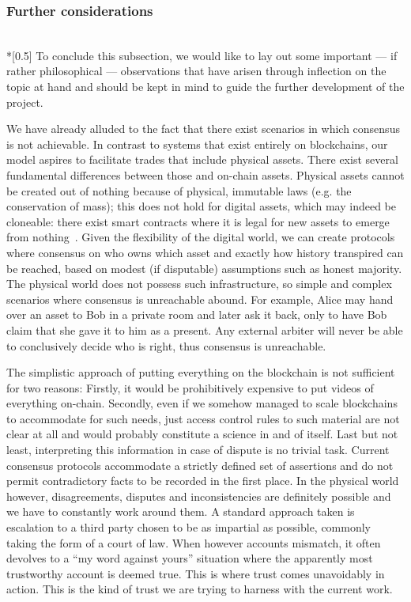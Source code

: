 \subsubsection{Further considerations} \ \\*[0.5\baselineskip]
  To conclude this subsection, we would like to lay out some important --- if rather
  philosophical --- observations that have arisen through inflection on the topic at hand
  and should be kept in mind to guide the further development of the project.

  We have already alluded to the fact that there exist scenarios in which consensus is not
  achievable. In contrast to systems that exist entirely on blockchains, our model aspires
  to facilitate trades that include physical assets. There exist several fundamental
  differences between those and on-chain assets. Physical assets cannot be created out of
  nothing because of physical, immutable laws (e.g. the conservation of mass); this
  does not hold for digital assets, which may indeed be cloneable: there exist smart
  contracts where it is legal for new assets to emerge from nothing~\cite{cryptokitties}.
  Given the flexibility of the digital world, we can create protocols where consensus on
  who owns which asset and exactly how history transpired can be reached, based on modest
  (if disputable) assumptions such as honest majority. The physical world does not possess
  such infrastructure, so simple and complex scenarios where consensus is unreachable
  abound. For example, Alice may hand over an asset to Bob in a private room and later ask
  it back, only to have Bob claim that she gave it to him as a present. Any external
  arbiter will never be able to conclusively decide who is right, thus consensus is
  unreachable.

  The simplistic approach of putting everything on the blockchain is not sufficient for
  two reasons: Firstly, it would be prohibitively expensive to put videos of everything
  on-chain. Secondly, even if we somehow managed to scale blockchains to accommodate for
  such needs, just access control rules to such material are not clear at all and would
  probably constitute a science in and of itself. Last but not least, interpreting this
  information in case of dispute is no trivial task. Current consensus protocols
  accommodate a strictly defined set of assertions and do not permit contradictory facts
  to be recorded in the first place. In the physical world however, disagreements,
  disputes and inconsistencies are definitely possible and we have to constantly work
  around them. A standard approach taken is escalation to a third party chosen to be as
  impartial as possible, commonly taking the form of a court of law. When however accounts
  mismatch, it often devolves to a ``my word against yours'' situation where the
  apparently most trustworthy account is deemed true. This is where trust comes
  unavoidably in action. This is the kind of trust we are trying to harness with the
  current work.

